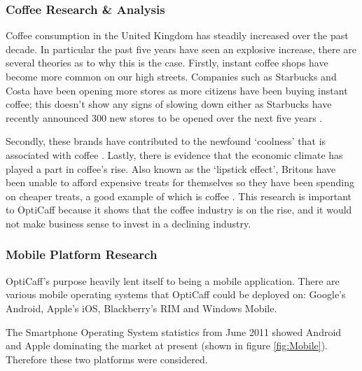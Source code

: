 \subsubsection{Coffee Research \& Analysis}
Coffee consumption in the United Kingdom has steadily increased over the past decade. 
In particular the past five years have seen an explosive increase, there are several theories as to why this is the case.
Firstly, instant coffee shops have become more common on our high streets. 
Companies such as Starbucks and Costa have been opening more stores as more citizens have been buying instant coffee; this doesn’t show any signs of slowing down either as Starbucks have recently announced 300 new stores to be opened over the next five years \cite{starbucks}.

Secondly, these brands have contributed to the newfound ‘coolness’ that is associated with coffee \cite{popular}. 
Lastly, there is evidence that the economic climate has played a part in coffee’s rise. 
Also known as the ‘lipstick effect’, Britons have been unable to afford expensive treats for themselves so they have been spending on cheaper treats, a good example of which is coffee \cite{costa}.
This research is important to OptiCaff because it shows that the coffee industry is on the rise, and it would not make business sense to invest in a declining industry.

\subsubsection{Mobile Platform Research}
\label{sec:Mobile}
OptiCaff’s purpose heavily lent itself to being a mobile application. 
There are various mobile operating systems that OptiCaff could be deployed on: Google's Android, Apple's iOS, Blackberry's RIM and Windows Mobile. 

The Smartphone Operating System statistics from June 2011 showed Android and Apple dominating the market at present (shown in figure \ref{fig:Mobile}).
Therefore these two platforms were considered.


